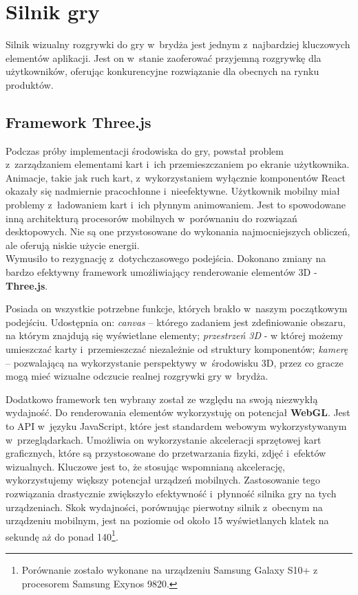 \section{Silnik gry}
\label{subsec:silnik_gry}

Silnik wizualny rozgrywki do gry w~brydża jest jednym z~najbardziej kluczowych
elementów aplikacji. Jest on w~stanie zaoferować przyjemną rozgrywkę dla
użytkowników, oferując konkurencyjne rozwiązanie dla obecnych na rynku produktów.

\subsection{Framework Three.js}
Podczas próby implementacji środowiska do gry, powstał problem z~zarządzaniem
elementami kart i~ich przemieszczaniem po ekranie użytkownika. Animacje, takie jak
ruch kart, z~wykorzystaniem wyłącznie komponentów React okazały się nadmiernie
pracochłonne i~nieefektywne. Użytkownik mobilny miał problemy z~ładowaniem kart
i~ich płynnym animowaniem. Jest to spowodowane inną architekturą procesorów
mobilnych w~porównaniu do rozwiązań desktopowych. Nie są one przystosowane
do wykonania najmocniejszych obliczeń, ale oferują niskie użycie energii. \\

Wymusiło to rezygnację z~dotychczasowego podejścia. Dokonano zmiany na bardzo
efektywny framework umożliwiający renderowanie elementów 3D - \textbf{Three.js}.

Posiada on wszystkie potrzebne funkcje, których brakło w~naszym początkowym
podejściu. Udostępnia on: \textit{canvas} -- którego zadaniem jest zdefiniowanie
obszaru, na którym znajdują się wyświetlane elementy;  \textit{przestrzeń 3D} - w której możemy umieszczać
karty i~przemieszczać niezależnie od struktury komponentów; \textit{kamerę} -- pozwalającą
na wykorzystanie perspektywy w~środowisku 3D, przez co gracze mogą mieć wizualne
odczucie realnej rozgrywki gry w~brydża.


Dodatkowo framework ten wybrany został ze względu na swoją niezwykłą wydajność.
Do renderowania elementów wykorzystuję on potencjał \textbf{WebGL}. Jest to API
w~języku JavaScript, które jest standardem webowym wykorzystywanym
w~przeglądarkach. Umożliwia on wykorzystanie akceleracji sprzętowej kart
graficznych, które są przystosowane do przetwarzania fizyki, zdjęć
i~efektów wizualnych. Kluczowe jest to, że stosując wspomnianą akcelerację,
wykorzystujemy większy potencjał urządzeń mobilnych. Zastosowanie tego rozwiązania
drastycznie zwiększyło efektywność i~płynność silnika gry na tych urządzeniach.
Skok wydajności, porównując pierwotny silnik z~obecnym na urządzeniu mobilnym,
jest na poziomie od około 15 wyświetlanych klatek na sekundę aż do
ponad 140\footnote{
    Porównanie zostało wykonane na urządzeniu
    Samsung Galaxy S10+ z procesorem Samsung Exynos 9820.
}.

